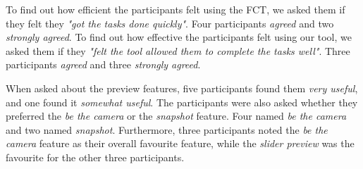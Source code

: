 To find out how efficient the participants felt using the FCT, we asked them if they felt they \textit{"got the tasks done quickly"}. Four participants \textit{agreed} and two \textit{strongly agreed}. To find out how effective the participants felt using our tool, we asked them if they \textit{"felt the tool allowed them to complete the tasks well"}. Three participants \textit{agreed} and three \textit{strongly agreed}.

When asked about the preview features, five participants found them \textit{very useful}, and one found it \textit{somewhat useful}. The participants were also asked whether they preferred the \textit{be the camera} or the \textit{snapshot} feature. Four named\textit{ be the camera} and two named \textit{snapshot}. Furthermore, three participants noted the \textit{be the camera} feature as their overall favourite feature, while the \textit{slider preview} was the favourite for the other three participants. 